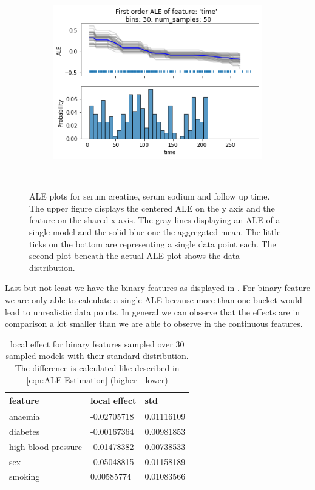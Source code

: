 \documentclass[11pt,
  a4paper,
  parskip=half, %
  BCOR=10mm, %
  english,
  ]{article}
\begin{document}
\begin{figure}[htp!]
\begin{center}
\begin{subfigure}[t]{.49\textwidth}
            \includegraphics[width=\linewidth]{images/ALE_time.png}
            \caption{}
            \label{fig:ALE-2/time}
        \end{subfigure} \\
    \end{center}
    \caption{ALE plots for serum creatine, serum sodium and follow up time. The upper figure displays the centered ALE on the y axis and the feature on the shared x axis. The gray lines displaying an ALE of a single model and the solid blue one the aggregated mean. The little ticks on the bottom are representing a single data point each. The second plot beneath the actual ALE plot shows the data distribution. }
    \label{fig:ALE-2}
\end{figure}

Last but not least we have the binary features as displayed in . For binary feature we are only able to calculate a single ALE because more than one bucket would lead to unrealistic data points. In general we can observe that the effects are in comparison a lot smaller than we are able to observe in the continuous features.
\begin{table}[htp!]
    \centering
    \begin{tabular}{l l l}
         \textbf{feature} &  \textbf{local effect} & \textbf{std}\\
         \hline \hline
         anaemia & -0.02705718 & 0.01116109 \\
         diabetes & -0.00167364  & 0.00981853 \\
         high blood pressure & -0.01478382 & 0.00738533\\
         sex & -0.05048815 & 0.01158189 \\
         smoking & 0.00585774 & 0.01083566\\  
    \end{tabular}
    \caption{local effect for binary features sampled over 30 sampled models with their standard distribution. The difference is calculated like described in \eqref{eqn:ALE-Estimation} (higher - lower)}
    \label{tab:binary-ALE}
\end{table}
\end{document}

